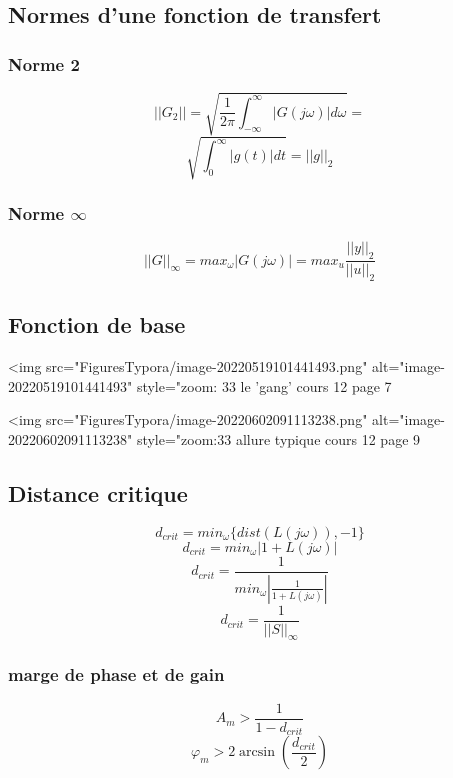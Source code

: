 \documentclass[resume]{subfiles}
\begin{document}
\subsection{Normes d'une fonction de transfert}

\subsubsection{Norme 2}

$$
||G_2|| = \sqrt{\frac{1}{2\pi}\int_{-\infty}^{\infty}|G(j\omega)| d\omega}=$$
$$\sqrt{\int_{0}^{\infty}|g(t)| dt} = ||g||_2$$

\subsubsection{Norme $\infty$}

$$
||G||_{\infty} = max_{\omega}|G(j\omega)| = max_{u} \frac{||y||_2}{||u||_2}
$$

\subsection{Fonction de base}

<img src="FiguresTypora/image-20220519101441493.png" alt="image-20220519101441493" style="zoom: 33%
le 'gang' cours 12 page 7

<img src="FiguresTypora/image-20220602091113238.png" alt="image-20220602091113238" style="zoom:33%
allure typique cours 12 page 9

\subsection{Distance critique}

$$d_{crit} = min_{\omega}\{dist(L(j\omega)), -1\}$$
$$d_{crit} = min_{\omega}|1+L(j\omega)|$$
$$d_{crit} = \frac{1}{min_{\omega}|\frac{1}{1+L(j\omega)}|}$$
$$d_{crit} = \frac{1}{||S||_\infty}$$

\subsubsection{marge de phase et de gain}
$$A_m > \frac{1}{1-d_{crit}}$$
$$\varphi_m > 2\arcsin(\frac{d_{crit}}{2})$$
\end{document}
